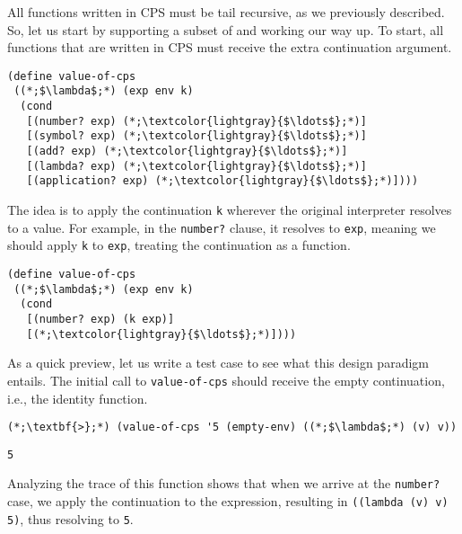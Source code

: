 All functions written in CPS must be tail recursive, as we previously described. So, let us start by supporting a subset of  and working our way up. To start, all functions that are written in CPS must receive the extra continuation argument.

\begin{cl}[]{}\begin{lstlisting}[language=MyScheme]
(define value-of-cps
 ((*;$\lambda$;*) (exp env k)
  (cond
   [(number? exp) (*;\textcolor{lightgray}{$\ldots$};*)]
   [(symbol? exp) (*;\textcolor{lightgray}{$\ldots$};*)]
   [(add? exp) (*;\textcolor{lightgray}{$\ldots$};*)]
   [(lambda? exp) (*;\textcolor{lightgray}{$\ldots$};*)]
   [(application? exp) (*;\textcolor{lightgray}{$\ldots$};*)])))
\end{lstlisting}\end{cl}

The idea is to apply the continuation \texttt{k} wherever the original interpreter resolves to a value. For example, in the \texttt{number?} clause, it resolves to \texttt{exp}, meaning we should apply \texttt{k} to \texttt{exp}, treating the continuation as a function.

\begin{cl}[]{}\begin{lstlisting}[language=MyScheme]
(define value-of-cps
 ((*;$\lambda$;*) (exp env k)
  (cond
   [(number? exp) (k exp)]
   [(*;\textcolor{lightgray}{$\ldots$};*)])))
\end{lstlisting}\end{cl}

As a quick preview, let us write a test case to see what this design paradigm entails. The initial call to \texttt{value-of-cps} should receive the empty continuation, i.e., the identity function.

\begin{clo}[]{}\begin{lstlisting}[language=MyScheme]
(*;\textbf{>};*) (value-of-cps '5 (empty-env) ((*;$\lambda$;*) (v) v))
\end{lstlisting}
\tcblower
\begin{lstlisting}[language=MyOutput]
5
\end{lstlisting}
\end{clo}

Analyzing the trace of this function shows that when we arrive at the \texttt{number?} case, we apply the continuation to the expression, resulting in \texttt{((lambda (v) v) 5)}, thus resolving to \texttt{5}.

